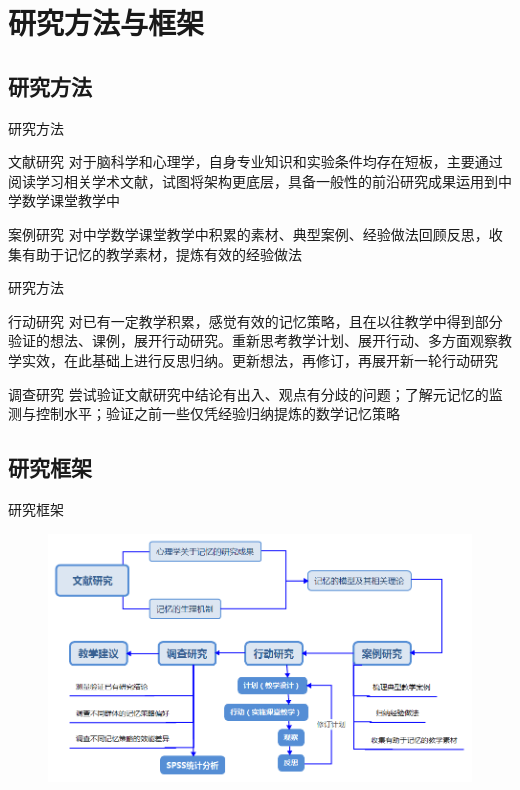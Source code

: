 \documentclass[serif]{beamer}
\begin{document}
  
  \section{研究方法与框架}
  \subsection{研究方法}
  \begin{frame}{研究方法}
     \begin{block}{文献研究}
     	对于脑科学和心理学，自身专业知识和实验条件均存在短板，主要通过阅读学习相关学术文献，试图将架构更底层，具备一般性的前沿研究成果运用到中学数学课堂教学中
     \end{block}
     \pause
     \begin{block}{案例研究}
     	对中学数学课堂教学中积累的素材、典型案例、经验做法回顾反思，收集有助于记忆的教学素材，提炼有效的经验做法
     \end{block}
  \end{frame}
  
  \begin{frame}{研究方法}
      \begin{block}{行动研究}
    	对已有一定教学积累，感觉有效的记忆策略，且在以往教学中得到部分验证的想法、课例，展开行动研究。重新思考教学计划、展开行动、多方面观察教学实效，在此基础上进行反思归纳。更新想法，再修订，再展开新一轮行动研究
    \end{block}
    \pause
    \begin{block}{调查研究}
  	    尝试验证文献研究中结论有出入、观点有分歧的问题；了解元记忆的监测与控制水平；验证之前一些仅凭经验归纳提炼的数学记忆策略
    \end{block}
\end{frame}
  
  \subsection{研究框架}
  \begin{frame}{研究框架}
      \begin{figure}[t]
      	\raggedright
      	\includegraphics[scale=0.35]{researchframe.png}
      \end{figure}
  \end{frame}
\end{document}
